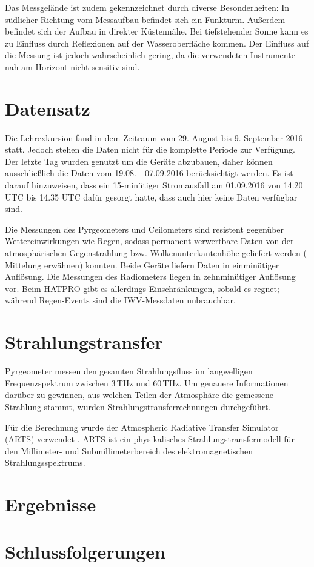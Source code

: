 \documentclass[10pt,a4paper,compsoc,peer review papers]{IEEEtran}
\begin{document}
Das Messgelände ist zudem gekennzeichnet durch diverse Besonderheiten: In
südlicher Richtung vom Messaufbau befindet sich ein Funkturm. Außerdem befindet
sich der Aufbau in direkter Küstennähe. Bei tiefstehender Sonne kann es zu
Einfluss durch Reflexionen auf der Wasseroberfläche kommen. Der Einfluss auf
die Messung ist jedoch wahrscheinlich gering, da die verwendeten Instrumente
nah am Horizont nicht sensitiv sind. 

\section{Datensatz}
Die Lehrexkursion fand in dem Zeitraum vom 29. August bis 9. September 2016
statt. Jedoch stehen die Daten nicht für die komplette Periode zur Verfügung.
Der letzte Tag wurden genutzt um die Geräte abzubauen, daher können
ausschließlich die Daten vom 19.08. - 07.09.2016 berücksichtigt werden. Es ist
darauf hinzuweisen, dass ein 15-minütiger Stromausfall am 01.09.2016 von 14.20
UTC bis 14.35 UTC dafür gesorgt hatte, dass auch hier keine Daten verfügbar
sind. 

Die Messungen des Pyrgeometers und Ceilometers sind resistent gegenüber
Wettereinwirkungen wie Regen, sodass permanent verwertbare Daten von der
atmosphärischen Gegenstrahlung bzw. Wolkenunterkantenhöhe geliefert werden (
Mittelung erwähnen) konnten. Beide Geräte liefern Daten in einminütiger
Auflösung. Die Messungen des Radiometers liegen in zehnminütiger Auflösung vor.
Beim HATPRO-gibt es allerdings Einschränkungen, sobald es regnet; während
Regen-Events sind die IWV-Messdaten unbrauchbar. 

\section{Strahlungstransfer}\label{sec:strahlungstransfer}
Pyrgeometer messen den gesamten Strahlungsfluss im langwelligen
Frequenzspektrum zwischen 3\,THz und 60\,THz. Um genauere Informationen darüber
zu gewinnen, aus welchen Teilen der Atmosphäre die gemessene Strahlung stammt,
wurden Strahlungstransferrechnungen durchgeführt.

Für die Berechnung wurde der Atmospheric Radiative Transfer Simulator (ARTS)
verwendet \cite{Eriksson2011}. ARTS ist ein physikalisches
Strahlungstransfermodell für den Millimeter- und Submillimeterbereich des
elektromagnetischen Strahlungsspektrums.

\section{Ergebnisse}\label{sec:ergebnisse}

\section{Schlussfolgerungen}\label{sec:schlussfolgerungen}



\end{document}
